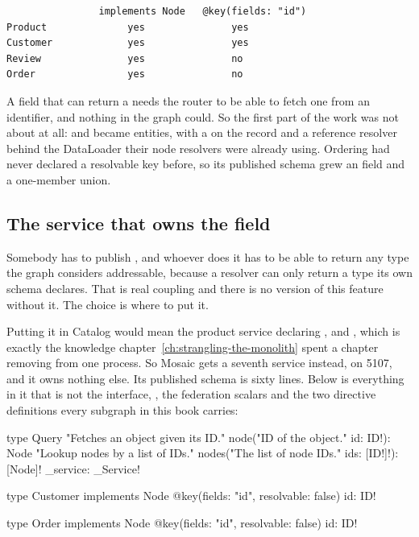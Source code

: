 \begin{verbatim}
                implements Node   @key(fields: "id")
Product              yes               yes
Customer             yes               yes
Review               yes               no
Order                yes               no
\end{verbatim}

A  field that can return a  needs the router to be able
to fetch one from an identifier, and nothing in the graph could. So the first
part of the work was not about  at all:  and
 became entities, with a \code{[Key("id")]} on the record and a
reference resolver behind the DataLoader their node resolvers were already
using. Ordering had never declared a resolvable key before, so its published
schema grew an  field and a one-member  union.

\subsection*{The service that owns the field}

%
Somebody has to publish , and whoever does it has to be able to return
any type the graph considers addressable, because a resolver can only return a
type its own schema declares. That is real coupling and there is no version of
this feature without it. The choice is where to put it.

Putting it in Catalog would mean the product service declaring ,
 and , which is exactly the knowledge
chapter~\ref{ch:strangling-the-monolith} spent a chapter removing from one
process. So Mosaic gets a seventh service instead, on 5107, and it owns nothing
else. Its published schema is sixty lines. Below is everything in it that is not
the  interface, , the federation scalars and the two
directive definitions every subgraph in this book carries:

\begin{graphqlsdl}[fontsize=\footnotesize]
type Query {
  "Fetches an object given its ID."
  node("ID of the object." id: ID!): Node
  "Lookup nodes by a list of IDs."
  nodes("The list of node IDs." ids: [ID!]!): [Node]!
  _service: _Service!
}

type Customer implements Node @key(fields: "id", resolvable: false) {
  id: ID!
}

type Order implements Node @key(fields: "id", resolvable: false) {
  id: ID!
}
\end{graphqlsdl}

